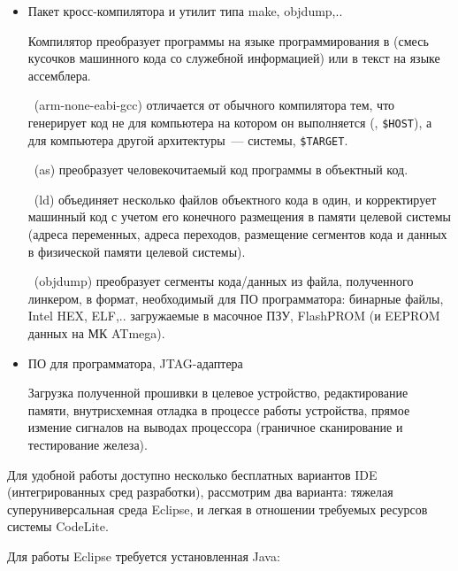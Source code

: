 \begin{itemize}
  \item Пакет кросс-компилятора и утилит типа make, objdump,..
  
  Компилятор преобразует программы на языке программирования в  (смесь кусочков машинного кода со служебной информацией) или в
  текст на языке ассемблера.
  
  \ (arm-none-eabi-gcc) отличается от обычного
  компилятора тем, что генерирует код не для компьютера на котором он выполняется
  (, \verb|$HOST|), а для компьютера другой
  архитектуры\ ---  системы, \verb|$TARGET|.
  
  \ (as) преобразует человекочитаемый код программы в объектный
  код.
  
  \ (ld) объединяет несколько файлов объектного кода в один,
  и корректирует машинный код с учетом его конечного размещения в памяти
  целевой системы (адреса переменных, адреса переходов, размещение сегментов
  кода и данных в физической памяти целевой системы).
  
  \ (objdump) преобразует сегменты кода/данных из файла,
  полученного линкером, в формат, необходимый для ПО программатора: бинарные файлы, Intel
  HEX, ELF,.. загружаемые в масочное ПЗУ, FlashPROM (и EEPROM данных на МК
  ATmega).
  
  \item ПО для программатора, JTAG-адаптера
  
  Загрузка полученной прошивки в целевое устройство, редактирование памяти, 
  внутрисхемная отладка в процессе работы устройства, прямое измение сигналов на
  выводах процессора (граничное сканирование и тестирование железа).
  
\end{itemize}


Для удобной работы доступно несколько бесплатных вариантов IDE (интегрированных сред разработки),
рассмотрим два варианта: тяжелая суперуниверсальная среда Eclipse, и легкая в отношении требуемых
ресурсов системы CodeLite.

\bigskip Для работы Eclipse требуется установленная Java:

\bigskip{}

